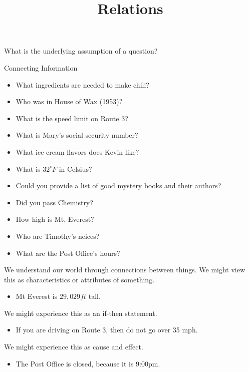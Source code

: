 \documentclass{ximera}
\title{Relations}
\begin{document}
\begin{abstract}

\end{abstract}
\maketitle


What is the underlying assumption of a question?


\begin{observation} Connecting Information

\begin{itemize} 
\item What ingredients are needed to make chili?
\item Who was in House of Wax (1953)?
\item What is the speed limit on Route 3?
\item What is Mary's social security number?
\item What ice cream flavors does Kevin like?
\item What is $32^\circ F$ in Celsius?
\item Could you provide a list of good mystery books and their authors?
\item Did you pass Chemistry?
\item How high is Mt. Everest?
\item Who are Timothy's neices?
\item What are the Post Office's hours?
\end{itemize}

We understand our world through connections between things. We might view this as characteristics or attributes of something. 
\begin{itemize}
\item Mt Everest is $29,029 ft$ tall.
\end{itemize}


We might experience this as an if-then statement.
\begin{itemize}
\item If you are driving on Route 3, then do not go over 35 mph.
\end{itemize}



We might experience this as cause and effect.
\begin{itemize}
\item The Post Office is closed, because it is 9:00pm.
\end{itemize}

\end{observation}
\end{document}
